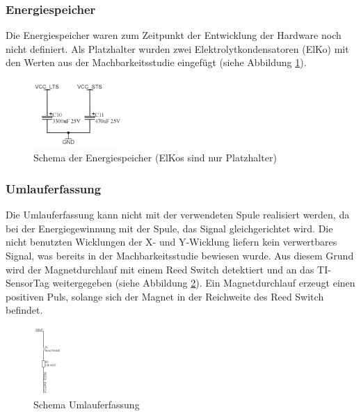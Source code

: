 \clearpage
\subsubsection{Energiespeicher}

Die Energiespeicher waren zum Zeitpunkt der Entwicklung der Hardware noch nicht definiert. Als Platzhalter wurden zwei Elektrolytkondensatoren (ElKo) mit den Werten aus der Machbarkeitsstudie eingefügt (siehe Abbildung \ref{schema_energiespeicher}). 

\begin{figure}[ht]
    \includegraphics[width=0.3\textwidth]{3Vorgehen/imag/Schema_Energiespeicher.png}
    \caption{Schema der Energiespeicher (ElKos sind nur Platzhalter)}
    \label{schema_energiespeicher} 
\end{figure}


\subsubsection{Umlauferfassung}

Die Umlauferfassung kann nicht mit der verwendeten Spule realisiert werden, da bei der Energiegewinnung mit der Spule, das Signal gleichgerichtet wird. Die nicht benutzten Wicklungen der X- und Y-Wicklung liefern kein verwertbares Signal, was bereits in der Machbarkeitsstudie bewiesen wurde. Aus diesem Grund wird der Magnetdurchlauf mit einem Reed Switch detektiert und an das TI-SensorTag weitergegeben (siehe Abbildung \ref{schema_umlaufdetektion}). Ein Magnetdurchlauf erzeugt einen positiven Puls, solange sich der Magnet in der Reichweite des Reed Switch befindet.

\begin{figure}[ht]
    \includegraphics[width=0.1\textwidth]{3Vorgehen/imag/Schema_Umlaufdetektion.png}
    \caption{Schema Umlauferfassung}\label{schema_umlaufdetektion} 
\end{figure}

